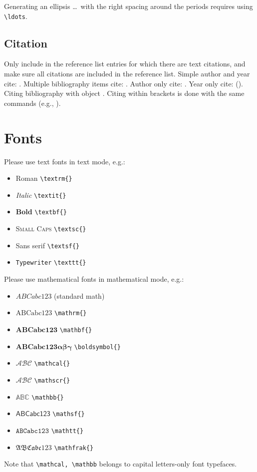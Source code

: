 \documentclass[rbe,wwwview]{econbr}
\begin{document}
Generating an ellipsis \ldots\ with the right spacing around the periods requires using \verb|\ldots|.

\subsection{Citation}
Only include in the reference list entries for which there are text citations, and make sure all citations are included in the reference list. Simple author and year cite: \citet{Engle1987}. Multiple bibliography items cite: \citet{Dahlquist2004,Hendry2001,Pesaran1998}. Author only cite: \citeauthor{Dahlquist2004}. Year only cite: (\citeyear{Pesaran1998}). Citing bibliography with object \citet[Theorem 1]{Engle1987}. Citing within brackets is done with the same commands (e.g., \citet{Dahlquist2004,Hendry2001}).

\section{Fonts}
Please use text fonts in text mode, e.g.:
\begin{itemize}
\item[]\textrm{Roman} \verb|\textrm{}|
\item[]\textit{Italic} \verb|\textit{}|
\item[]\textbf{Bold} \verb|\textbf{}|
\item[]\textsc{Small Caps} \verb|\textsc{}|
\item[]\textsf{Sans serif} \verb|\textsf{}|
\item[]\texttt{Typewriter} \verb|\texttt{}|
\end{itemize}
Please use mathematical fonts in mathematical mode, e.g.:
\begin{itemize}
\item[] $ABCabc123$ (standard math)
\item[] $\mathrm{ABCabc123}$ \verb|\mathrm{}|
\item[] $\mathbf{ABCabc123}$ \verb|\mathbf{}|
\item[] $\boldsymbol{ABCabc123\alpha\beta\gamma}$ \verb|\boldsymbol{}|
\item[] $\mathcal{ABC}$ \verb|\mathcal{}|
\item[] $\mathscr{ABC}$ \verb|\mathscr{}|
\item[] $\mathbb{ABC}$ \verb|\mathbb{}|
\item[] $\mathsf{ABCabc123}$ \verb|\mathsf{}| 
\item[] $\mathtt{ABCabc123}$ \verb|\mathtt{}|
\item[] $\mathfrak{ABCabc123}$ \verb|\mathfrak{}|
\end{itemize}
Note that \verb|\mathcal, \mathbb| belongs to capital letters-only font typefaces.
\end{document}
